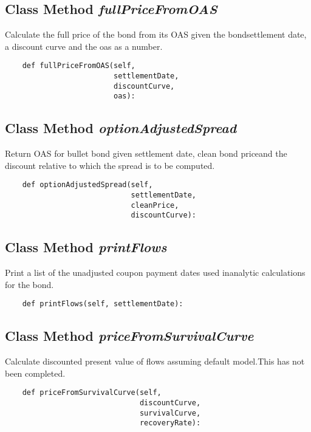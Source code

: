 \documentclass[twoside,11pt]{book}
\begin{document}
\subsection{Class Method {\it fullPriceFromOAS}}
Calculate the full price of the bond from its OAS given the bondsettlement date, a discount curve and the oas as a number. 

\begin{lstlisting}
    def fullPriceFromOAS(self,
                         settlementDate,
                         discountCurve,
                         oas):
\end{lstlisting}

\subsection{Class Method {\it optionAdjustedSpread}}
Return OAS for bullet bond given settlement date, clean bond priceand the discount relative to which the spread is to be computed. 

\begin{lstlisting}
    def optionAdjustedSpread(self,
                             settlementDate,
                             cleanPrice,
                             discountCurve):
\end{lstlisting}

\subsection{Class Method {\it printFlows}}
Print a list of the unadjusted coupon payment dates used inanalytic calculations for the bond. 

\begin{lstlisting}
    def printFlows(self, settlementDate):
\end{lstlisting}

\subsection{Class Method {\it priceFromSurvivalCurve}}
Calculate discounted present value of flows assuming default model.This has not been completed. 

\begin{lstlisting}
    def priceFromSurvivalCurve(self,
                               discountCurve,
                               survivalCurve,
                               recoveryRate):
\end{lstlisting}
\end{document}
